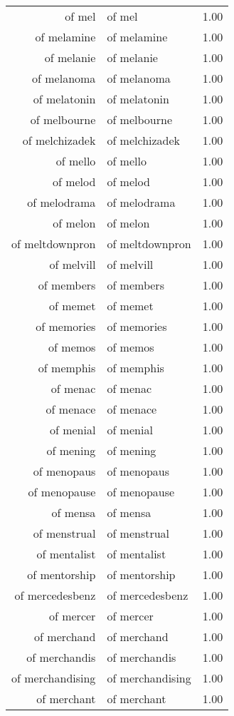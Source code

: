 \begin{table}[ht]
\begin{tabular}{rlr}
  of mel & of mel & 1.00 \\ 
  of melamine & of melamine & 1.00 \\ 
  of melanie & of melanie & 1.00 \\ 
  of melanoma & of melanoma & 1.00 \\ 
  of melatonin & of melatonin & 1.00 \\ 
  of melbourne & of melbourne & 1.00 \\ 
  of melchizadek & of melchizadek & 1.00 \\ 
  of mello & of mello & 1.00 \\ 
  of melod & of melod & 1.00 \\ 
  of melodrama & of melodrama & 1.00 \\ 
  of melon & of melon & 1.00 \\ 
  of meltdownpron & of meltdownpron & 1.00 \\ 
  of melvill & of melvill & 1.00 \\ 
  of members & of members & 1.00 \\ 
  of memet & of memet & 1.00 \\ 
  of memories & of memories & 1.00 \\ 
  of memos & of memos & 1.00 \\ 
  of memphis & of memphis & 1.00 \\ 
  of menac & of menac & 1.00 \\ 
  of menace & of menace & 1.00 \\ 
  of menial & of menial & 1.00 \\ 
  of mening & of mening & 1.00 \\ 
  of menopaus & of menopaus & 1.00 \\ 
  of menopause & of menopause & 1.00 \\ 
  of mensa & of mensa & 1.00 \\ 
  of menstrual & of menstrual & 1.00 \\ 
  of mentalist & of mentalist & 1.00 \\ 
  of mentorship & of mentorship & 1.00 \\ 
  of mercedesbenz & of mercedesbenz & 1.00 \\ 
  of mercer & of mercer & 1.00 \\ 
  of merchand & of merchand & 1.00 \\ 
  of merchandis & of merchandis & 1.00 \\ 
  of merchandising & of merchandising & 1.00 \\ 
  of merchant & of merchant & 1.00 \\ 

\end{tabular}
\end{table}
